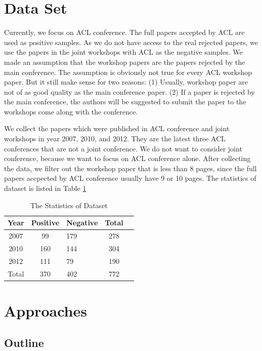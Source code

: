 \documentclass[11pt,letterpaper]{article}
\begin{document}
\section{Data Set}
Currently, we focus on ACL conference.
The full papers accepted by ACL are used as positive samples. 
As we do not have access to the real rejected papers, 
we use the papers in the joint workshops with ACL as the negative samples.
We made an assumption that the workshop papers are the papers rejected by the main conference.
The assumption is obviously not true for every ACL workshop paper.
But it still make sense for two reasons:
(1) Usually, workshop paper are not of as good quality as the main conference paper. 
(2) If a paper is rejected by the main conference, the authors will be suggested to submit the paper to the workshops come along with the conference.


We collect the papers which were published in ACL conference and joint workshops in year 2007, 2010, and 2012. 
They are the latest three ACL conferences that are not a joint conference.
We do not want to consider joint conference, because we want to focus on ACL conference alone.
After collecting the data, we filter out the workshop paper that is less than 8 pages, since the full papers accpected by ACL conference usually have 9 or 10 pages.
The statistics of dataset is listed in Table \ref{tab:statistics} 

\begin{table}
\begin{center}
\begin{tabular}{|c|cl|c|c|}
\hline 
Year & Positive &	Negative & Total\\ \hline 
2007 & 99  &	179 & 278\\ \hline	
2010 	& 160 &  144 & 304	\\ \hline
2012 	& 111 & 79 & 190 \\ \hline
Total & 370 & 402 & 772 \\\hline	
\end{tabular}
\end{center}
\label{tab:statistics}
\caption{The Statistics of Dataset}
\end{table}

\section{Approaches}
\subsection{Outline}
\end{document}
